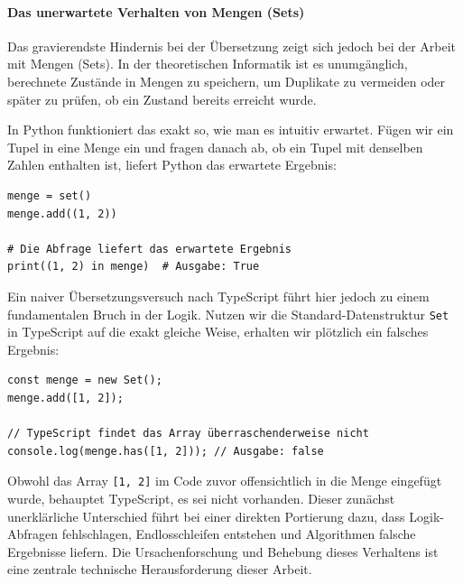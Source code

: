 \paragraph*{Das unerwartete Verhalten von Mengen (Sets)}
Das gravierendste Hindernis bei der Übersetzung zeigt sich jedoch bei der Arbeit mit Mengen (Sets). In der theoretischen Informatik ist es unumgänglich, berechnete Zustände in Mengen zu speichern, um Duplikate zu vermeiden oder später zu prüfen, ob ein Zustand bereits erreicht wurde.

In Python funktioniert das exakt so, wie man es intuitiv erwartet. Fügen wir ein Tupel in eine Menge ein und fragen danach ab, ob ein Tupel mit denselben Zahlen enthalten ist, liefert Python das erwartete Ergebnis:

\begin{listing}[H]
	\caption{Mengen in Python: Das erwartete Verhalten}
	\label{lst:set_python}
	\begin{verbatim}
menge = set()
menge.add((1, 2))

# Die Abfrage liefert das erwartete Ergebnis
print((1, 2) in menge)  # Ausgabe: True
	\end{verbatim}
\end{listing}

Ein naiver Übersetzungsversuch nach TypeScript führt hier jedoch zu einem fundamentalen Bruch in der Logik. Nutzen wir die Standard-Datenstruktur \texttt{Set} in TypeScript auf die exakt gleiche Weise, erhalten wir plötzlich ein falsches Ergebnis:

\begin{listing}[H]
	\caption{Mengen in TypeScript: Das fehlerhafte Verhalten}
	\label{lst:set_ts_untyped}
	\begin{verbatim}
const menge = new Set();
menge.add([1, 2]);

// TypeScript findet das Array überraschenderweise nicht
console.log(menge.has([1, 2])); // Ausgabe: false
	\end{verbatim}
\end{listing}

Obwohl das Array \texttt{[1, 2]} im Code zuvor offensichtlich in die Menge eingefügt wurde, behauptet TypeScript, es sei nicht vorhanden. Dieser zunächst unerklärliche Unterschied führt bei einer direkten Portierung dazu, dass Logik-Abfragen fehlschlagen, Endlosschleifen entstehen und Algorithmen falsche Ergebnisse liefern. Die Ursachenforschung und Behebung dieses Verhaltens ist eine zentrale technische Herausforderung dieser Arbeit.

